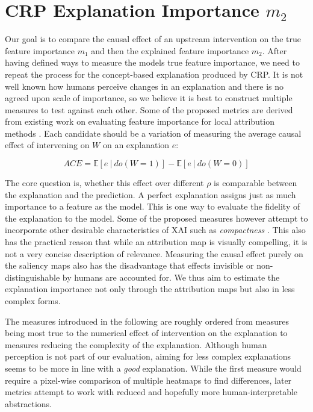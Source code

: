 
\section{CRP Explanation Importance $m_2$}\label{section:measure}
Our goal is to compare the causal effect of an upstream intervention on the true feature importance $m_1$ and then the explained feature importance $m_2$. After having defined ways to measure the models true feature importance, we need to repeat the process for the concept-based explanation produced by CRP. It is not well known how humans perceive changes in an explanation and there is no agreed upon scale of importance, so we believe it is best to construct multiple measures to test against each other. Some of the proposed metrics are derived from existing work on evaluating feature importance for local attribution methods \citep{Sixt2020, Karimi2023, Arras2022}. Each candidate should be a variation of measuring the average causal effect of intervening on $W$ on an explanation $e$:
\begin{center}
\begin{equation}
\displaystyle ACE = \mathbb{E} [e \ | \ do(W=1) ] - \mathbb{E} [ e \ | \ do(W=0) ]
\end{equation}
\end{center}

The core question is, whether this effect over different $\rho$ is comparable between the explanation and the prediction. A perfect explanation assigns just as much importance to a feature as the model. This is one way to evaluate the fidelity of the explanation to the model. Some of the proposed measures however attempt to incorporate other desirable characteristics of XAI such as \textit{compactness} \citep{Nauta2023}. This also has the practical reason that while an attribution map is visually compelling, it is not a very concise description of relevance. Measuring the causal effect purely on the saliency maps also has the disadvantage that effects invisible or non-distinguishable by humans are accounted for. 
We thus aim to estimate the explanation importance not only through the attribution maps but also in less complex forms. 

The measures introduced in the following are roughly ordered from measures being most true to the numerical effect of intervention on the explanation to measures reducing the complexity of the explanation. Although human perception is not part of our evaluation, aiming for less complex explanations seems to be more in line with a \textit{good} explanation. While the first measure would require a pixel-wise comparison of multiple heatmaps to find differences, later metrics attempt to work with reduced and hopefully more human-interpretable abstractions. 

